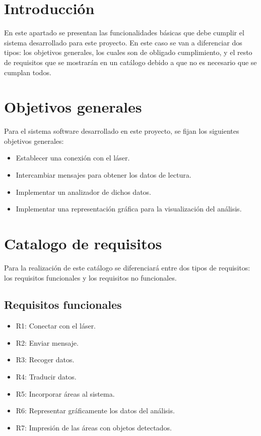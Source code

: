 
\section{Introducción}
En este apartado se presentan las funcionalidades básicas que debe cumplir el sistema desarrollado para este proyecto. En este caso se van a diferenciar dos tipos: los objetivos generales, los cuales son de obligado cumplimiento, y el resto de requisitos que se mostrarán en un catálogo debido a que  no es necesario que se cumplan todos.

\section{Objetivos generales}
Para el sistema software desarrollado en este proyecto, se fijan los siguientes objetivos generales:
\begin{itemize}
	\item Establecer una conexión con el láser.
	\item Intercambiar mensajes para obtener los datos de lectura.
	\item Implementar un analizador de dichos datos.
	\item Implementar una representación gráfica para la visualización del análisis.
\end{itemize}

\section{Catalogo de requisitos}
Para la realización de este catálogo se diferenciará entre dos tipos de requisitos: los requisitos funcionales y los requisitos no funcionales.
\subsection{Requisitos funcionales}
 \begin{itemize}
 	\item R1: Conectar con el láser.
 	\item R2: Enviar mensaje.
 	\item R3: Recoger datos.
 	\item R4: Traducir datos.
 	\item R5: Incorporar áreas al sistema.
 	\item R6: Representar gráficamente los datos del análisis.
 	\item R7: Impresión de las áreas con objetos detectados.
 \end{itemize}
